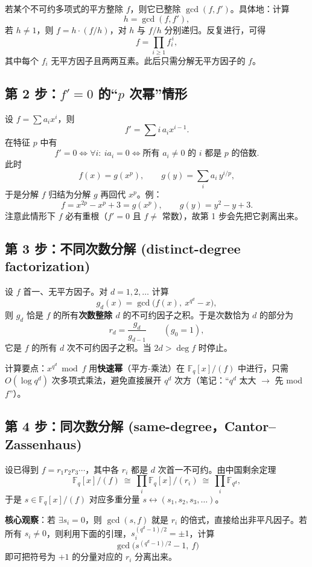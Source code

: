 \documentclass[11pt,a4paper]{ctexart}
\theoremstyle{remark}
\begin{document}
若某个不可约多项式的平方整除 $f$，则它已整除 $\gcd(f,f')$。具体地：计算
\[
h=\gcd(f,f'),
\]
若 $h\neq1$，则 $f=h\cdot(f/h)$，对 $h$ 与 $f/h$ 分别递归。反复进行，可得
\[
f=\prod_{i\ge1}f_i^{\,i},
\]
其中每个 $f_i$ 无平方因子且两两互素。此后只需分解无平方因子的 $f$。

\subsection*{第 2 步：$f'=0$ 的“$p$ 次幂”情形}

设 $f=\sum a_ix^{i}$，则
\[
f'=\sum i\,a_ix^{i-1}.
\]
在特征 $p$ 中有
\[
f'=0\iff \forall i:\ ia_i=0 \iff \text{所有 }a_i\neq0\text{ 的 }i\text{ 都是 }p\text{ 的倍数}.
\]
此时
\[
f(x)=g(x^{p}),\qquad g(y)=\sum_{i}a_{i}\,y^{i/p},
\]
于是分解 $f$ 归结为分解 $g$ 再回代 $x^{p}$。例：
\[
f=x^{2p}-x^{p}+3=g(x^{p}),\qquad g(y)=y^{2}-y+3 .
\]
注意此情形下 $f$ 必有重根（$f'=0$ 且 $f\neq$ 常数），故第 1 步会先把它剥离出来。

\subsection*{第 3 步：不同次数分解 (distinct-degree factorization)}

设 $f$ 首一、无平方因子。对 $d=1,2,\dots$ 计算
\[
g_{d}(x)=\gcd\bigl(f(x),\ x^{q^{d}}-x\bigr),
\]
则 $g_{d}$ 恰是 $f$ 的所有\textbf{次数整除 $d$} 的不可约因子之积。于是次数恰为 $d$ 的部分为
\[
r_{d}=\frac{g_{d}}{g_{d-1}}\qquad(g_{0}=1),
\]
它是 $f$ 的所有 $d$ 次不可约因子之积。当 $2d>\deg f$ 时停止。

计算要点：$x^{q^{d}}\bmod f$ 用\textbf{快速幂}（平方-乘法）在 $\mathbb{F}_{q}[x]/(f)$ 中进行，只需 $O(\log q^{d})$ 次多项式乘法，避免直接展开 $q^{d}$ 次方（笔记：“$q^{d}$ 太大 $\to$ 先 mod $f$”）。

\subsection*{第 4 步：同次数分解 (same-degree，Cantor--Zassenhaus)}

设已得到 $f=r_{1}r_{2}r_{3}\cdots$，其中各 $r_i$ 都是 $d$ 次首一不可约。由中国剩余定理
\[
\mathbb{F}_{q}[x]/(f)\ \cong\ \prod_{i}\mathbb{F}_{q}[x]/(r_{i})\ \cong\ \prod_{i}\mathbb{F}_{q^{d}},
\]
于是 $s\in\mathbb{F}_{q}[x]/(f)$ 对应多重分量 $s\leftrightarrow(s_1,s_2,s_3,\dots)$。

\textbf{核心观察}：若 $\exists s_i=0$，则 $\gcd(s,f)$ 就是 $r_i$ 的倍式，直接给出非平凡因子。若所有 $s_i\neq0$，则利用下面的引理，$s_i^{(q^{d}-1)/2}=\pm1$，计算
\[
\gcd\bigl(s^{(q^{d}-1)/2}-1,\ f\bigr)
\]
即可把符号为 $+1$ 的分量对应的 $r_i$ 分离出来。
\end{document}
